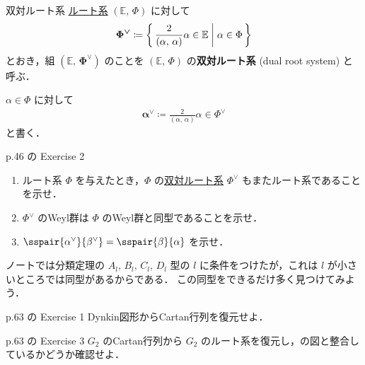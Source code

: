 \documentclass{ltjsarticle}
\theoremstyle{mystyle} %
\numberwithin{equation}{section}
\begin{document}
\begin{mydef}[label=def:dual-root]{双対ルート系}
	\hyperref[ax:root-system]{ルート系} $(\mathbb{E},\, \Phi)$ に対して
	\begin{align}
		\bm{\Phi^{\vee}} \coloneqq \biggl\{\, \frac{2}{(\alpha,\, \alpha)} \alpha \in \mathbb{E} \biggm| \alpha \in \Phi \,\biggr\} 
	\end{align}
	とおき，組 $\bm{(\mathbb{E},\, \Phi^\vee)}$ のことを $(\mathbb{E},\, \Phi)$ の\textbf{双対ルート系} (dual root system) と呼ぶ．
	
	\tcblower
	
	$\alpha \in \Phi$ に対して
	\begin{align}
		\bm{\alpha^\vee} \coloneqq \frac{2}{(\alpha,\, \alpha)} \alpha \in \Phi^\vee
	\end{align}
	と書く．
\end{mydef}

\begin{myproblem}[label=ex:3-9-2]{p.46 の Exercise 2}
    \begin{enumerate}
        \item ルート系 $\Phi$ を与えたとき，$\Phi$ の\hyperref[def:dual-root]{双対ルート系} $\Phi^\vee$ もまたルート系であることを示せ．
        \item $\Phi^\vee$ のWeyl群は $\Phi$ のWeyl群と同型であることを示せ．
        \item $\sspair{\alpha^\vee}{\beta^\vee} = \sspair{\beta}{\alpha}$ を示せ．
    \end{enumerate}
\end{myproblem}


\begin{myproblem}[label=ex:3-sp]{}
    ノートでは分類定理の $A_l,\, B_l,\, C_l,\, D_l$ 型の $l$ に条件をつけたが，これは $l$ が小さいところでは同型があるからである．
    この同型をできるだけ多く見つけてみよう．
\end{myproblem}

\begin{myproblem}[label=ex:3-11-1]{p.63 の Exercise 1}
    Dynkin図形からCartan行列を復元せよ．
\end{myproblem}

\begin{myproblem}[label=ex:3-11-3]{p.63 の Exercise 3}
    $G_2$ のCartan行列から $G_2$ のルート系を復元し，\cite[p.44]{Humphreys1972introduction}の図と整合しているかどうか確認せよ．
\end{myproblem}
\end{document}
